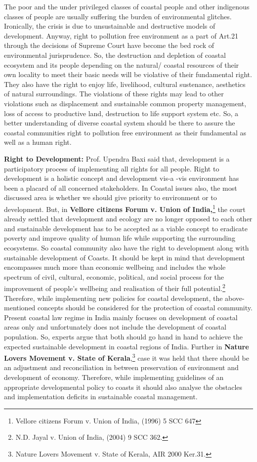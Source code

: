 \begin{multicols}{2}
\noi
The poor and the under privileged classes of coastal people and other indigenous classes of
people are usually suffering the burden of environmental glitches. Ironically, the crisis is due
to unsustainable and destructive models of development. Anyway, right to pollution free 
environment as a part of Art.21 through the decisions of Supreme Court have become the bed
rock of environmental jurisprudence. So, the destruction and depletion of coastal ecosystem
and its people depending on the natural/ coastal resources of their own locality to meet their
basic needs will be violative of their fundamental right. They also have the right to enjoy life,
livelihood, cultural sustenance, aesthetics of natural surroundings. The violations of these
rights may lead to other violations such as displacement and sustainable common property
management, loss of access to productive land, destruction to life support system etc. So, a
better understanding of diverse coastal system should be there to assure the coastal
communities right to pollution free environment as their fundamental as well as a human
right.

\noi
{\large\bfseries Right to Development:} Prof. Upendra Baxi said that, development is a
participatory process of implementing all rights for all people. Right to development is a
holistic concept and development vis-a -vis environment has been a placard of all concerned
stakeholders. In Coastal issues also, the most discussed area is whether we should give
priority to environment or to development. But, in \textbf{Vellore citizens Forum v. Union of
India,}\footnote{Vellore citizens Forum v. Union of India, (1996) 5 SCC 647} the court already settled that development and ecology are no longer opposed to
each other and sustainable development has to be accepted as a viable concept to eradicate
poverty and improve quality of human life while supporting the surrounding ecosystems. So
coastal community also have the right to development along with sustainable development of
Coasts. It should be kept in mind that development encompasses much more than economic
wellbeing and includes the whole spectrum of civil, cultural, economic, political, and social
process for the improvement of people’s wellbeing and realisation of their full potential.\footnote{N.D. Jayal v. Union of India, (2004) 9 SCC 362.}
Therefore, while implementing new policies for coastal development, the above-mentioned
concepts should be considered for the protection of coastal community. Present coastal law
regime in India mainly focuses on development of coastal areas only and unfortunately does
not include the development of coastal population. So, experts argue that both should go hand
in hand to achieve the expected sustainable development in coastal regions of India. Further
in \textbf{Nature Lovers Movement v. State of Kerala},\footnote{Nature Lovers Movement v. State of Kerala, AIR 2000 Ker.31.} case it was held that there should be an
adjustment and reconciliation in between preservation of environment and development of 
economy. Therefore, while implementing guidelines of an appropriate developmental policy
to coasts it should also analyse the obstacles and implementation deficits in sustainable
coastal management.


\end{multicols}
